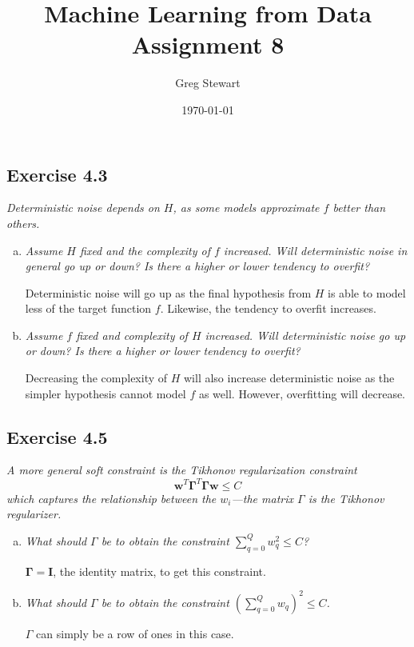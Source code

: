 \documentclass{article}
\title{Machine Learning from Data Assignment 8}
\author{Greg Stewart}
\date{\today}
\renewcommand{\vec}[1]{\mathbf{#1}}
\begin{document}
\maketitle

\subsection*{Exercise 4.3}

\textit{Deterministic noise depends on $H$, as some models approximate $f$ better than others.}

\begin{enumerate}[(a)]
  \item \textit{Assume $H$ fixed and the complexity of $f$ increased. Will deterministic noise
    in general go up or down? Is there a higher or lower tendency to overfit?}

    Deterministic noise will go up as the final hypothesis from $H$ is able to model less
    of the target function $f$. Likewise, the tendency to overfit increases.
    
  \item \textit{Assume $f$ fixed and complexity of $H$ increased. Will deterministic noise go up
    or down? Is there a higher or lower tendency to overfit?}

    Decreasing the complexity of $H$ will also increase deterministic noise as the simpler
    hypothesis cannot model $f$ as well. However, overfitting will decrease.

\end{enumerate}

\subsection*{Exercise 4.5}

\textit{A more general soft constraint is the Tikhonov regularization constraint 
$$\vec{w}^T\vec{\Gamma}^T\vec{\Gamma}\vec{w} \leq C$$ which captures the relationship between the
$w_i$---the matrix $\Gamma$ is the Tikhonov regularizer.}

\begin{enumerate}[(a)]
  \item \textit{What should $\Gamma$ be to obtain the constraint
    $\sum_{q=0}^Q w_q^2 \leq C$?}

    $\vec{\Gamma} = \vec{I}$, the identity matrix, to get this constraint.

  \item \textit{What should $\Gamma$ be to obtain the constraint
    $(\sum_{q=0}^Q w_q)^2 \leq C$.}

    $\Gamma$ can simply be a row of ones in this case.
    

\end{enumerate}
\end{document}
